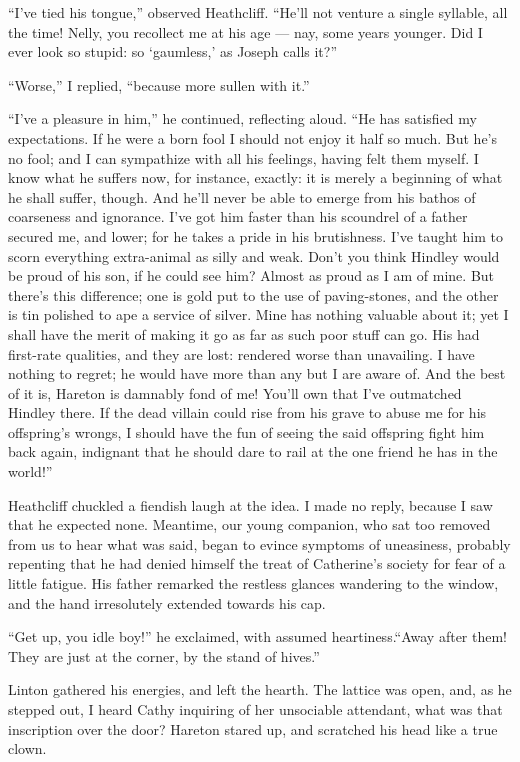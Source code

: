 \par “I've tied his tongue,” observed Heathcliff. “He'll not venture a single syllable, all the time! Nelly, you recollect me at his age — nay, some years younger. Did I ever look so stupid: so ‘gaumless,’ as Joseph calls it?”
\par “Worse,” I replied, “because more sullen with it.”
\par “I've a pleasure in him,” he continued, reflecting aloud. “He has satisfied my expectations. If he were a born fool I should not enjoy it half so much. But he's no fool; and I can sympathize with all his feelings, having felt them myself. I know what he suffers now, for instance, exactly: it is merely a beginning of what he shall suffer, though. And he'll never be able to emerge from his bathos of coarseness and ignorance. I've got him faster than his scoundrel of a father secured me, and lower; for he takes a pride in his brutishness. I've taught him to scorn everything extra-animal as silly and weak. Don't you think Hindley would be proud of his son, if he could see him? Almost as proud as I am of mine. But there's this difference; one is gold put to the use of paving-stones, and the other is tin polished to ape a service of silver. Mine has nothing valuable about it; yet I shall have the merit of making it go as far as such poor stuff can go. His had first-rate qualities, and they are lost: rendered worse than unavailing. I have nothing to regret; he would have more than any but I are aware of. And the best of it is, Hareton is damnably fond of me! You'll own that I've outmatched Hindley there. If the dead villain could rise from his grave to abuse me for his offspring's wrongs, I should have the fun of seeing the said offspring fight him back again, indignant that he should dare to rail at the one friend he has in the world!”
\par Heathcliff chuckled a fiendish laugh at the idea. I made no reply, because I saw that he expected none. Meantime, our young companion, who sat too removed from us to hear what was said, began to evince symptoms of uneasiness, probably repenting that he had denied himself the treat of Catherine's society for fear of a little fatigue. His father remarked the restless glances wandering to the window, and the hand irresolutely extended towards his cap.
\par “Get up, you idle boy!” he exclaimed, with assumed heartiness.“Away after them! They are just at the corner, by the stand of hives.”
\par Linton gathered his energies, and left the hearth. The lattice was open, and, as he stepped out, I heard Cathy inquiring of her unsociable attendant, what was that inscription over the door? Hareton stared up, and scratched his head like a true clown.
